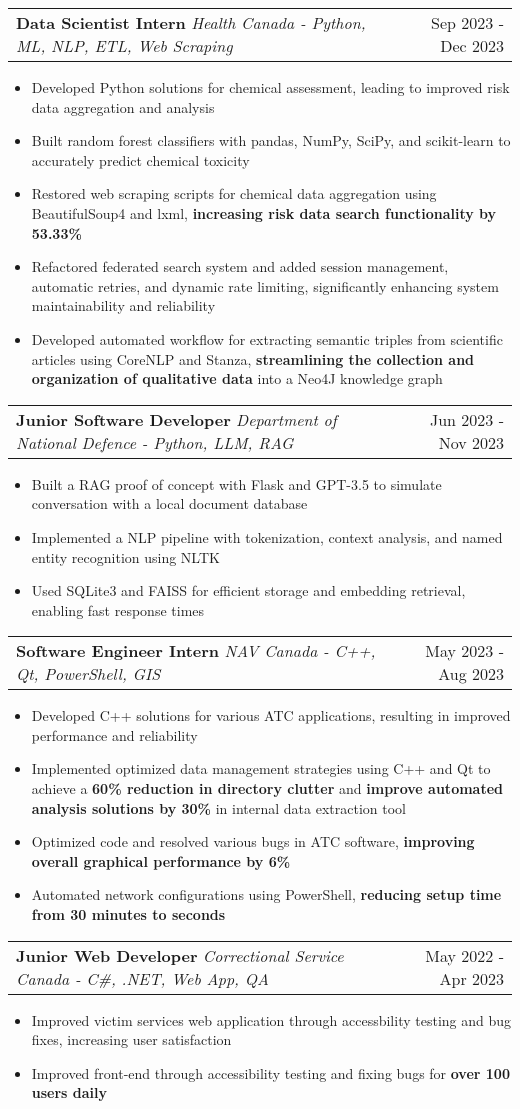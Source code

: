\documentclass[letterpaper,11pt]{article}
\makeatletter
\newcommand{\resumeItem}[1]{
  \item\small{
    {#1 \vspace{-3pt}}
  }
}
\newcommand{\resumeSubheading}[3]{
    \item
    \begin{tabular*}{0.97\textwidth}[t]{l@{\extracolsep{\fill}}r}
      \textbf{#1} \textbar \textit{ #2} & #3 \\
    \end{tabular*}\vspace{-7.5pt}
}
\newcommand{\resumeItemListStart}{\begin{itemize}}
\newcommand{\resumeItemListEnd}{\end{itemize}\vspace{-5pt}}
\makeatother
\begin{document}
    \resumeSubheading
      {Data Scientist Intern}{Health Canada - Python, ML, NLP, ETL, Web Scraping}{Sep 2023 - Dec 2023}
      \resumeItemListStart
        \resumeItem{Developed Python solutions for chemical assessment, leading to improved risk data aggregation and analysis}
        \resumeItem{Built random forest classifiers with pandas, NumPy, SciPy, and scikit-learn to accurately predict chemical toxicity}
        \resumeItem{Restored web scraping scripts for chemical data aggregation using BeautifulSoup4 and lxml, \textbf{increasing risk data search functionality by 53.33\%}}
        \resumeItem{Refactored federated search system and added session management, automatic retries, and dynamic rate limiting, significantly enhancing system maintainability and reliability}
        \resumeItem{Developed automated workflow for extracting semantic triples from scientific articles using CoreNLP and Stanza, \textbf{streamlining the collection and organization of qualitative data} into a Neo4J knowledge graph}
      \resumeItemListEnd

    \resumeSubheading
    {Junior Software Developer}{Department of National Defence - Python, LLM, RAG}{Jun 2023 - Nov 2023}
      \resumeItemListStart
        \resumeItem{Built a RAG proof of concept with Flask and GPT-3.5 to simulate conversation with a local document database}
        \resumeItem{Implemented a NLP pipeline with tokenization, context analysis, and named entity recognition using NLTK}
        \resumeItem{Used SQLite3 and FAISS for efficient storage and embedding retrieval, enabling fast response times}
      \resumeItemListEnd

    \resumeSubheading
    {Software Engineer Intern}{NAV Canada - C++, Qt, PowerShell, GIS}{May 2023 - Aug 2023}
      \resumeItemListStart
        \resumeItem{Developed C++ solutions for various ATC applications, resulting in improved performance and reliability}
        \resumeItem{Implemented optimized data management strategies using C++ and Qt to achieve a \textbf{60\% reduction in directory clutter} and \textbf{improve automated analysis solutions by 30\%} in internal data extraction tool}
        \resumeItem{Optimized code and resolved various bugs in ATC software, \textbf{improving overall graphical performance by 6\%}}
        \resumeItem{Automated network configurations using PowerShell, \textbf{reducing setup time from 30 minutes to seconds}}
      \resumeItemListEnd

    \resumeSubheading
    {Junior Web Developer}{Correctional Service Canada - C\#, .NET, Web App, QA}{May 2022 - Apr 2023}
      \resumeItemListStart
        \resumeItem{Improved victim services web application through accessbility testing and bug fixes, increasing user satisfaction}
        \resumeItem{Improved front-end through accessibility testing and fixing bugs for \textbf{over 100 users daily}}
      \resumeItemListEnd
\end{document}
